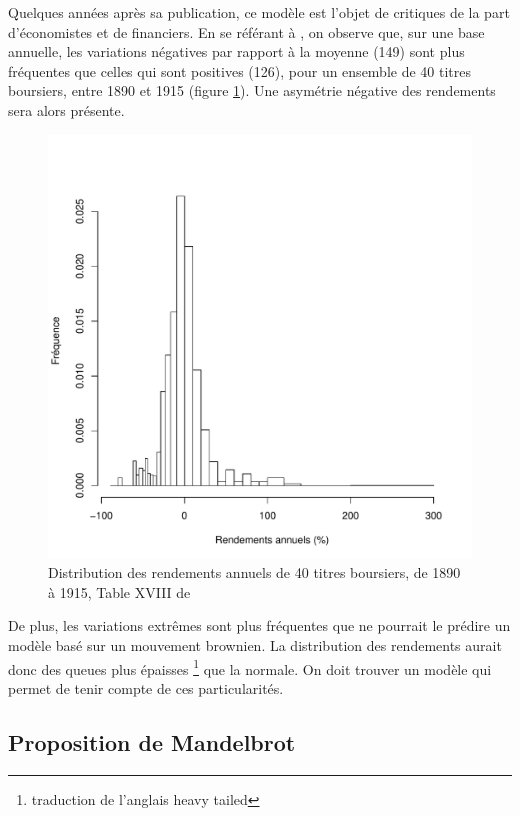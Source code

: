 Quelques années après sa publication, ce modèle est l'objet de
critiques de la part d'économistes et de financiers. En se référant à
\cite{mitchell1916critique}, on observe que, sur une base annuelle,
les variations négatives par rapport à la moyenne (149) sont plus
fréquentes que celles qui sont positives (126), pour un ensemble de 40
titres boursiers, entre 1890 et 1915 (figure \ref{fig:mitchell1}).
Une asymétrie négative des rendements sera alors présente.
\begin{figure}[!ht]
  \centering
  \includegraphics[scale=0.75]{./graphiques/mitchell1.pdf}
  \caption{Distribution des rendements annuels de 40 titres boursiers,
    de 1890 à 1915, Table XVIII de \cite{mitchell1916critique}}
  \label{fig:mitchell1}
\end{figure}

De plus, les variations extrêmes sont plus fréquentes que ne pourrait
le prédire un modèle basé sur un mouvement brownien. La distribution
des rendements aurait donc des queues plus épaisses
\footnote{traduction de l'anglais heavy tailed} que la normale. On
doit trouver un modèle qui permet de tenir compte de ces
particularités.

\subsection{Proposition de Mandelbrot}
\label{sec:mandelbrot}


